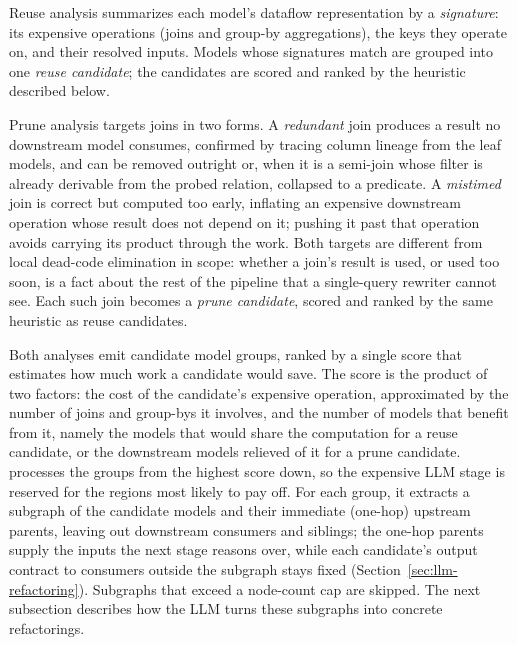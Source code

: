 Reuse analysis summarizes each model's dataflow representation by a \emph{signature}: its expensive operations (joins and group-by aggregations), the keys they operate on, and their resolved inputs. Models whose signatures match are grouped into one \emph{reuse candidate}; the candidates are scored and ranked by the heuristic described below.

Prune analysis targets joins in two forms. A \emph{redundant} join produces a result no downstream model consumes, confirmed by tracing column lineage from the leaf models, and can be removed outright or, when it is a semi-join whose filter is already derivable from the probed relation, collapsed to a predicate. A \emph{mistimed} join is correct but computed too early, inflating an expensive downstream operation whose result does not depend on it; pushing it past that operation avoids carrying its product through the work. Both targets are different from local dead-code elimination in scope: whether a join's result is used, or used too soon, is a fact about the rest of the pipeline that a single-query rewriter cannot see. Each such join becomes a \emph{prune candidate}, scored and ranked by the same heuristic as reuse candidates.

Both analyses emit candidate model groups, ranked by a single score that estimates how much work a candidate would save. The score is the product of two factors: the cost of the candidate's expensive operation, approximated by the number of joins and group-bys it involves, and the number of models that benefit from it, namely the models that would share the computation for a reuse candidate, or the downstream models relieved of it for a prune candidate. \tool{} processes the groups from the highest score down, so the expensive LLM stage is reserved for the regions most likely to pay off. For each group, it extracts a subgraph of the candidate models and their immediate (one-hop) upstream parents, leaving out downstream consumers and siblings; the one-hop parents supply the inputs the next stage reasons over, while each candidate's output contract to consumers outside the subgraph stays fixed (Section~\ref{sec:llm-refactoring}). Subgraphs that exceed a node-count cap are skipped. The next subsection describes how the LLM turns these subgraphs into concrete refactorings.


